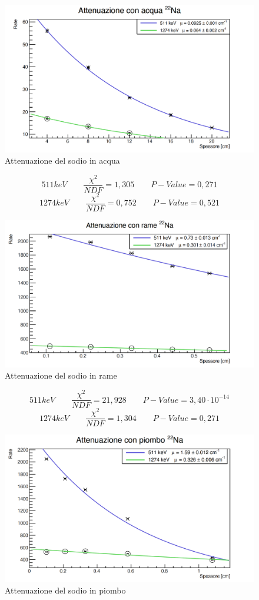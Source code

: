 \documentclass[a4paper,10pt]{article}
\begin{document}
\begin{figure}[H]
    \centering
    \includegraphics[scale=0.45]{grafici/attenuazionesodioacqua}
    \caption{Attenuazione del sodio in acqua}
\end{figure}
$$
	511 keV \qquad \frac{\chi^2}{NDF}  = 1,305 \qquad P-Value = 0,271
$$
$$
	1274 keV \qquad \frac{\chi^2}{NDF}  = 0,752 \qquad P-Value = 0,521
$$
\begin{figure}[H]
    \centering
    \includegraphics[scale=0.45]{grafici/attenuazionesodiorame}
    \caption{Attenuazione del sodio in rame}
\end{figure}
$$
	511 keV \qquad \frac{\chi^2}{NDF}  = 21,928 \qquad P-Value = 3,40\cdot 10^{-14}
$$
$$
	1274 keV \qquad \frac{\chi^2}{NDF}  = 1,304 \qquad P-Value = 0,271
$$
\begin{figure}[H]
    \centering
    \includegraphics[scale=0.45]{grafici/attenuazionesodiopiombo}
    \caption{Attenuazione del sodio in piombo}
\end{figure}
\end{document}
